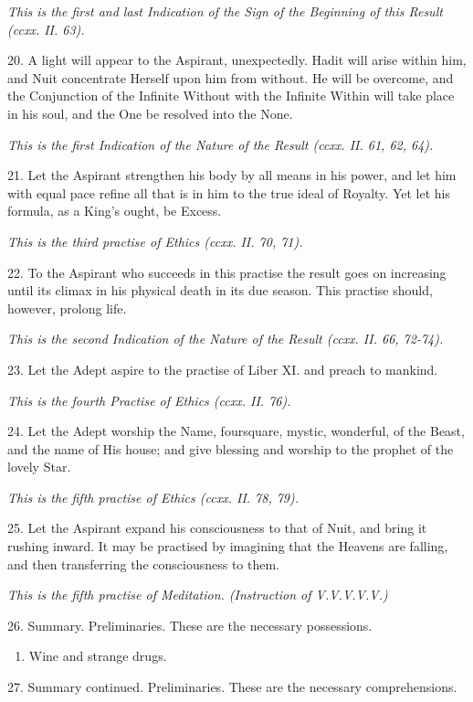 \textit{This is the first and last Indication of the Sign of the Beginning of this Result (ccxx. II. 63).}

20. A light will appear to the Aspirant, unexpectedly. Hadit will arise within him, and Nuit concentrate Herself upon him from without. He will be overcome, and the Conjunction of the Infinite Without with the Infinite Within will take place in his soul, and the One be resolved into the None.

\textit{This is the first Indication of the Nature of the Result (ccxx. II. 61, 62, 64).}

21. Let the Aspirant strengthen his body by all means in his power, and let him with equal pace refine all that is in him to the true ideal of Royalty. Yet let his formula, as a King's ought, be Excess.

\textit{This is the third practise of Ethics (ccxx. II. 70, 71).}

22. To the Aspirant who succeeds in this practise the result goes on increasing until its climax in his physical death in its due season. This practise should, however, prolong life.

\textit{This is the second Indication of the Nature of the Result (ccxx. II. 66, 72-74).}

23. Let the Adept aspire to the practise of Liber XI. and preach to mankind.

\textit{This is the fourth Practise of Ethics (ccxx. II. 76).}

24. Let the Adept worship the Name, foursquare, mystic, wonderful, of the Beast, and the name of His house; and give blessing and worship to the prophet of the lovely Star.

\textit{This is the fifth practise of Ethics (ccxx. II. 78, 79).}

25. Let the Aspirant expand his consciousness to that of Nuit, and bring it rushing inward. It may be practised by imagining that the Heavens are falling, and then transferring the consciousness to them.

\textit{This is the fifth practise of Meditation. (Instruction of V.V.V.V.V.)}

26. Summary. Preliminaries. These are the necessary possessions.
\begin{enumerate}[leftmargin=4\parindent]
\item Wine and strange drugs.
\end{enumerate}

27. Summary continued. Preliminaries. These are the necessary comprehensions.

